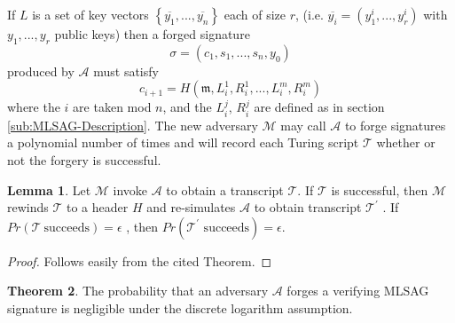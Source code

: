 \documentclass[12pt,english]{mrl}
\theoremstyle{definition}
\newtheorem{lem}{Lemma}[section]
\newtheorem{thm}[lem]{Theorem}
\numberwithin{equation}{section}
\numberwithin{figure}{section}
\numberwithin{equation}{section}
\numberwithin{equation}{section}
\numberwithin{figure}{section}
\begin{document}
If $L$ is a set of key vectors $\left\{ \overline{y_{1}},...,\overline{y_{n}}\right\} $
each of size $r$, (i.e. $\overline{y_{i}}=\left(y_{1}^{i},...,y_{r}^{i}\right)$
with $y_{1},...,y_{r}$ public keys) then a forged signature 
\[
\sigma=\left(c_{1},s_{1},...,s_{n},y_{0}\right)
\]
 produced by $\mathcal{A}$ must satisfy 
\[
c_{i+1}=H\left(\mathfrak{m},L_{i}^{1},R_{i}^{1},...,L_{i}^{m},R_{i}^{m}\right)
\]
 where the $i$ are taken mod $n$, and the $L_{i}^{j}$, $R_{i}^{j}$
are defined as in section \ref{sub:MLSAG-Description}. The new adversary $\mathcal{M}$
may call $\mathcal{A}$ to forge signatures a polynomial number of
times and will record each Turing script $\mathcal{T}$ whether
or not the forgery is successful. 
\begin{lem}
\label{lem:RewindingLemma}\cite[Lemma 1]{LWW} %
{} Let $\mathcal{M}$ invoke $\mathcal{A}$ to obtain a transcript $\mathcal{T}.$
If $\mathcal{T}$ is successful, then $\mathcal{M}$ rewinds $\mathcal{T}$
to a header $H$ and re-simulates $\mathcal{A}$ to obtain transcript
$\mathcal{T}^{\prime}$ . If $Pr\left(\mathcal{T}\ \mbox{succeeds}\right)=\epsilon$
, then $Pr\left(\mathcal{T}^{\prime}\mbox{ succeeds}\right)=\epsilon.$ \end{lem}
\begin{proof}
Follows easily from the cited Theorem. \end{proof}
\begin{thm}
\label{thm:Unforgeability}The probability that an adversary $\mathcal{A}$
forges a verifying MLSAG signature is negligible under the discrete
logarithm assumption. 
\end{thm}
\end{document}
